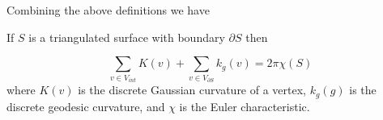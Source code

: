 Combining the above definitions  we have

\begin{theorem} \label{thm:g-b-d}

If $S$ is a triangulated surface with  boundary $\partial S$ then

$$\sum_{v\in V_{int}} K(v) + \sum_{v\in V_{\partial S}} k_g(v) = 2\pi \chi(S)$$
where $K(v)$ is the discrete Gaussian curvature
of a vertex, $k_g(g)$ is the discrete geodesic curvature,  and
$\chi$ is the Euler characteristic.
\end{theorem}



